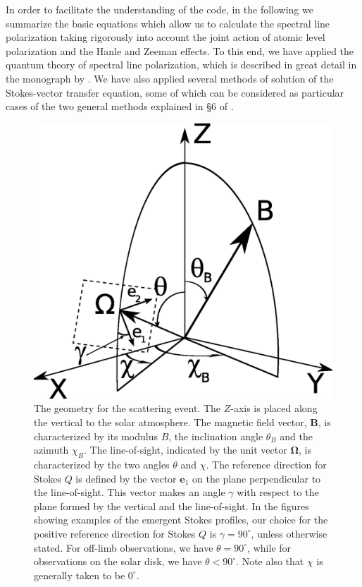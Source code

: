 \documentclass[12pt]{article}
\begin{document}
In order to facilitate the understanding of the code, in 
the following we summarize the basic equations which allow us to 
calculate the spectral line polarization taking rigorously into account the 
joint action of atomic level polarization and the Hanle and Zeeman effects. To this end, we have applied the 
quantum theory of spectral line polarization, which is described in great detail 
in the monograph by \cite{landi_landolfi04}. We have also applied several methods 
of solution of the Stokes-vector transfer equation, some of which can be 
considered as particular cases of the two general methods explained in \S6 of \cite{trujillo03}.

\begin{figure}
\includegraphics[width=\columnwidth]{f1.eps}
\caption{The geometry for the scattering event. The $Z$-axis is placed along the vertical
to the solar atmosphere. The magnetic field vector,
$\mathbf{B}$,
is characterized by its modulus $B$, the inclination angle $\theta_B$ and
the azimuth $\chi_B$. The line-of-sight, indicated by the unit vector
$\mathbf{\Omega}$,
is characterized by the two angles $\theta$ and $\chi$.
The reference direction for Stokes $Q$ is defined by the vector $\mathbf{e}_1$
on the plane
perpendicular to the line-of-sight. This vector makes an angle $\gamma$ with
respect to the plane formed by
the vertical and the line-of-sight. In the figures showing examples of the
emergent Stokes profiles, our
choice for the positive reference direction for Stokes $Q$ is $\gamma=90^\circ$, unless otherwise stated.
For off-limb observations, we have $\theta=90^\circ$, while for observations
on the solar disk, we have $\theta<90^\circ$. Note also that $\chi$ is generally taken to be $0^\circ$.
\label{fig:geometry}}
\end{figure}
\end{document}
